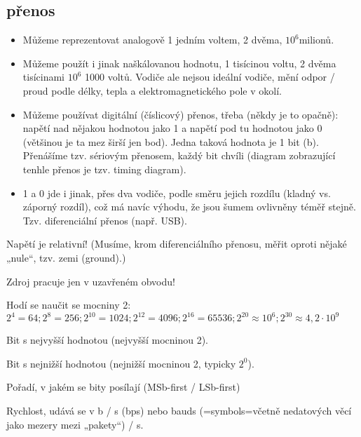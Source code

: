 \documentclass[12pt]{article}					%
\begin{document}
    \subsection{přenos}
        \begin{itemize}
            \item Můžeme reprezentovat analogově 1 jedním voltem, 2 dvěma, $10^6$milionů.
            \item Můžeme použít i jinak naškálovanou hodnotu, 1 tisícinou voltu, 2 dvěma tisícinami $10^6$ 1000 voltů. Vodiče ale nejsou ideální vodiče, mění odpor / proud podle délky, tepla a elektromagnetického pole v okolí.
            \item Můžeme používat digitální (číslicový) přenos, třeba (někdy je to opačně): napětí nad nějakou hodnotou jako 1 a napětí pod tu hodnotou jako 0 (většinou je ta mez širší jen bod). Jedna taková hodnota je 1 bit (b). Přenášíme tzv. sériovým přenosem, každý bit chvíli (diagram zobrazující tenhle přenos je tzv. timing diagram).
            \item 1 a 0 jde i jinak, přes dva vodiče, podle směru jejich rozdílu (kladný vs. záporný rozdíl), což má navíc výhodu, že jsou šumem ovlivněny téměř stejně. Tzv. diferenciální přenos (např. USB).
        \end{itemize}
        \begin{upozorneni}
                Napětí je relativní! (Musíme, krom diferenciálního přenosu, měřit oproti nějaké „nule“, tzv. zemi (ground).)
        \end{upozorneni}
        \begin{upozorneni}
            Zdroj pracuje jen v uzavřeném obvodu!
        \end{upozorneni}
        \begin{poznamka}[Mocniny 2]
            Hodí se naučit se mocniny 2: $2^4 = 64; 2^8 = 256; 2^10 = 1024; 2^12 = 4096; 2^16 = 65536; 2^20 \approx 10^6; 2^30 \approx 4,2\cdot 10^9$
        \end{poznamka}
        \begin{definice}
            Bit s nejvyšší hodnotou (nejvyšší mocninou 2).
        \end{definice}
        \begin{definice}
            Bit s nejnižší hodnotou (nejnižší mocninou 2, typicky $2^0$).
        \end{definice}
        \begin{definice}[Bitorder]
            Pořadí, v jakém se bity posílají (MSb-first / LSb-first)
        \end{definice}
        \begin{definice}
                Rychlost, udává se v b / s (bps) nebo bauds (=symbols=včetně nedatových věcí jako mezery mezi „pakety“) / s.
        \end{definice}
        
\end{document}
